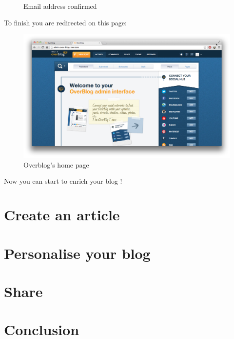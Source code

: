\documentclass[a4paper,10pt]{article}
\begin{document}
\begin{enumerate}
\begin{figure}[H]
    \caption{Email address confirmed}
\end{figure}
To finish you are redirected on this page:
\begin{figure}[H]
    \center
	\includegraphics[width=13cm]{Images/overblogPage.png}
    \caption{Overblog's home page}
\end{figure}
Now you can start to enrich your blog !
\end{enumerate}


\newpage
\section{Create an article}



\newpage
\section{Personalise your blog}


\newpage
\section{Share}


\newpage
\section{Conclusion}
\end{document}
